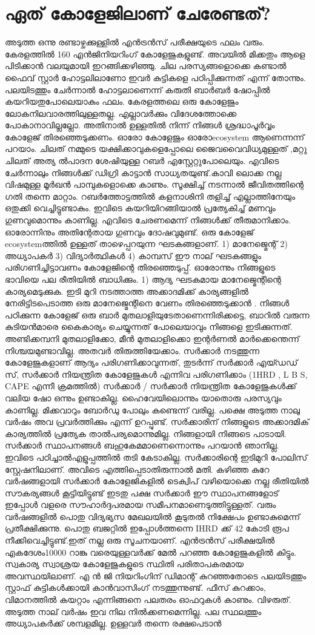 \documentclass[10pt,a4paper]{report}
\begin{document}
   
   \section{ ഏത് കോളേജിലാണ് ചേരേണ്ടത്? }
  അടുത്ത ഒന്നു രണ്ടാഴ്ചക്കുള്ളിൽ എൻട്രൻസ് പരീക്ഷയുടെ ഫലം വരും. കേരളത്തിൽ 160 എൻജിനിയറിംഗ് കോളേജുകളുണ്ട്. അവയിൽ മിക്കതും ആളെ പിടിക്കാൻ വലയുമായി ഇറങ്ങിക്കഴിഞ്ഞു. ചില പരസ്യങ്ങളൊക്കെ കണ്ടാൽ ഫൈവ് സ്റ്റാർ ഹോട്ടലിലാണോ ഇവർ കുട്ടികളെ പഠിപ്പിക്കുന്നത് എന്ന് തോന്നും. പലയിടത്തും ചേർന്നാൽ ഹോട്ടലാണെന്ന് കരുതി ബാർബർ ഷോപ്പിൽ കയറിയതുപോലെയാകും ഫലം. കേരളത്തലെ ഒരു കോളേജും ലോകനിലവാരത്തിലുള്ളതല്ല. എല്ലാവർക്കും വിദേശത്തോക്കെ പോകാനാവില്ലല്ലോ. അതിനാൽ ഉള്ളതിൽ നിന്ന് നിങ്ങൾ ശ്രദ്ധാപൂർവ്വം കോളേജ് തിരഞ്ഞെടുക്കണം. ഓരോ കോളേജും ഓരോecosystem ആണെന്നന്ന് പറയാം. ചിലത് നമ്മുടെ യക്ഷിക്കാവുകളെപ്പോലെ ജൈവവൈവിധ്യമുള്ളത് ,മറ്റു ചിലത് അത്യ ൽപാദന ശേഷിയുള്ള റബർ എസ്റ്റേറ്റുപോലെയും. എവിടെ ചേർന്നാലും നിങ്ങൾക്ക് ഡിഗ്രി കാട്ടാൻ സാധ്യതയുണ്ട്.കാവി ലൊക്ക നല്ല വിഷമുള്ള മൂർഖൻ പാമ്പുകളൊക്കെ കാണും. സൂക്ഷിച്ച് നടന്നാൽ ജീവിതത്തിന്റെ ഗതി തന്നെ മാറ്റാം. റബർത്തോട്ടത്തിൽ കളനാശിനി തളിച്ച് എല്ലാത്തിനേയും ഒതുക്കി വെച്ചിട്ടുണ്ടാകും. ഇവിടെ കയറിയിറങ്ങിയാൽ പ്രത്യേകിച്ച് മണവും ഗുണവുമൊന്നും കാണില്ല. എവിടെ ചേരണമെന്ന് നിങ്ങൾക്ക് തീരുമാനിക്കാം. ഓരോന്നിനും അതിന്റേതായ ഗുണവും ദോഷവുമുണ്ട്. ഒരു കോളേജ് ecosystemത്തിൽ ഉള്ളത് താഴെപ്പറയുന്ന ഘടകങ്ങളാണ്. 1) മാനേജ്മെന്റ് 2) അധ്യാപകർ 3) വിദ്യാർത്ഥികൾ 4) കാമ്പസ് ഈ നാല് ഘടകങ്ങളും പരിഗണിച്ചിട്ടാവണം കോളേജിന്റെ തിരഞ്ഞെടുപ്പ്. ഓരോന്നും നിങ്ങളുടെ ഭാവിയെ പല രീതിയിൽ ബാധിക്കും. 1) ആദ്യ ഘടകമായ മാനേജ്മെന്റിന്റെ കാര്യമെടുക്കുക. ഇടി മുറി നടത്താത്ത അക്കാദമിക്ക് കാര്യങ്ങളിൽ നേരിട്ടിടപെടാത്ത ഒരു മാനേജ്മെന്റിനെ വേണം തിരഞ്ഞെടുക്കാൻ . നിങ്ങൾ പഠിക്കുന്ന കോളേജ് ഒരു ബാർ മുതലാളിയുടേതാണെന്നിരിക്കട്ടെ, ബാറിൽ വരുന്ന കുടിയൻമാരെ കൈകാര്യം ചെയ്യുന്നത് പോലെയാവും നിങ്ങളെ ഇടിക്കുന്നത്. അണ്ടിക്കമ്പനി മുതലാളിക്കോ, മീൻ മുതലാളിക്കൊ ഇന്റർണൽ മാർക്കെന്തെന്ന് നിശ്ചയമുണ്ടാവില്ല. അതവർ തിരുത്തിയേക്കാം. സർക്കാർ നടത്തുന്ന കോളേജുകളാണ് ആദ്യം പരിഗണിക്കാവുന്നത്, തുടർന്ന് സർക്കാർ എയ്ഡഡ് സ്, സർക്കാർ നിയന്ത്രിത കോളേജുകൾ എന്നിവ പരിഗണിക്കാം (1HRD , L B S, CAPE എന്നീ ക്രമത്തിൽ) സർക്കാർ / സർക്കാർ നിയന്ത്രിത കോളേജുകൾക്ക് വലിയ ഷോ ഒന്നും ഉണ്ടാകില്ല. ഹൈവേയിലൊന്നും യാതൊരു പരസ്യവും കാണില്ല. മിക്കവാറും ബോർഡു പോലും കണ്ടെന്ന് വരില്ല. പക്ഷെ അടുത്ത നാലു വർഷം അവ പ്രവർത്തിക്കും എന്ന് ഉറപ്പുണ്ട്. സർക്കാരിന് നിങ്ങളുടെ അക്കാദമിക് കാര്യത്തിൽ പ്രത്യേക താൽപര്യമൊന്നുമില്ല. നിങ്ങളായി നിങ്ങടെ പാടായി. സർക്കാർ സ്ഥാപനങ്ങൾ ബഹുകേമമാണെന്നൊന്നും പറയാൻ ഞാനില്ല. ഇവിടെ പഠിച്ചാൽഎളുപ്പത്തിൽ തടി കേടാകില്ല. സർക്കാരിന്റെ ഇടിമുറി പോലിസ് സ്റ്റേഷനിലാണ്. അവിടെ എത്തിപ്പെടാതിരുന്നാൽ മതി. കഴിഞ്ഞ കുറേ വർഷങ്ങളായി സർക്കാർ കോളേജികളിൽ ടെക്വിപ് വഴിയൊക്കെ നല്ല രീതിയിൽ സൗകര്യങ്ങൾ കൂട്ടിയിട്ടുണ്ട് ഇടതു പക്ഷ സർക്കാർ ഈ സ്ഥാപനങ്ങളോട് ഇപ്പോൾ വളരെ സൗഹാർദ്ദപരമായ സമീപനമാണെടുത്തിട്ടുള്ളത്. വരും വർഷങ്ങളിൽ പൊതു വിദ്യഭ്യസ മേഖലയിൽ കൂടുതൽ നിക്ഷേപം ഉണ്ടാകുമെന്ന് പ്രതീക്ഷിക്കുന്നു. പൊതു ബജറ്റിൽ ഇപ്പോൾത്തന്നെ IHRD ക്ക് 42 കോടി രൂപ നീക്കിവെച്ചിട്ടുണ്ട്.ഇത് നല്ല ഒരു സൂചനയാണ്. എൻട്രൻസ് പരീക്ഷയിൽ എകദേശം10000 റാങ്കു വരെയുള്ളവർക്ക് മേൽ പറഞ്ഞ കോളേജുകളിൽ കിട്ടും. സ്വകാര്യ സ്വാശ്രയ കോളേജുകളുടെ സ്ഥിതി പരിതാപകരമായ അവസ്ഥയിലാണ്. എ ൻ ജി നിയറിംഗിന് ഡിമാന്റ് കുറഞ്ഞതോടെ പലയിടത്തും സ്റ്റാഫ് കുട്ടികൾക്കായി കാൻവാസിംഗ് നടത്തുന്നുണ്ട്. ഫീസ് കുറക്കാം, വിമാനത്തിൽ കയറ്റാം എന്നിങ്ങനെ പലതരം ഓഫറുകൾ കാണും. വിഴരുത്. അടുത്ത നാല് വർഷം ഇവ നില നിൽക്കണമെന്നില്ല. പല സ്ഥലത്തും അധ്യാപകർക്ക് ശമ്പളമില്ല. ഉള്ളവർ തന്നെ രക്ഷപെടാൻ 
\end{document}
